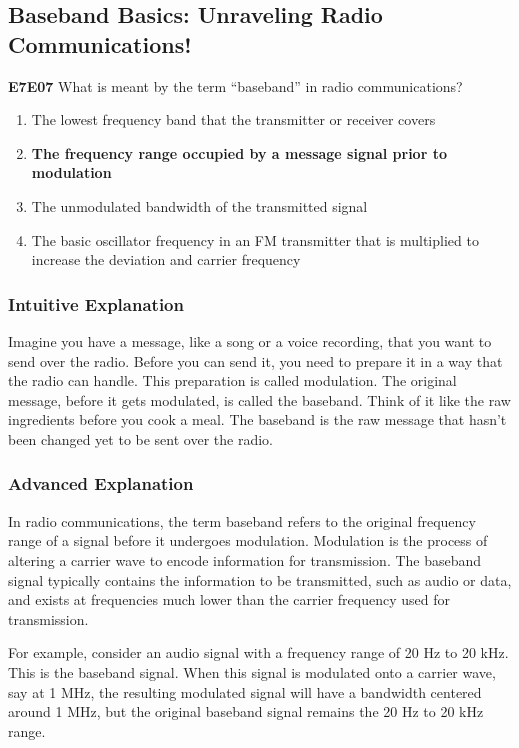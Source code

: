 \subsection{Baseband Basics: Unraveling Radio Communications!}

\begin{tcolorbox}[colback=gray!10!white,colframe=black!75!black,title=Multiple Choice Question]
\textbf{E7E07} What is meant by the term “baseband” in radio communications?

\begin{enumerate}[label=\Alph*.]
    \item The lowest frequency band that the transmitter or receiver covers
    \item \textbf{The frequency range occupied by a message signal prior to modulation}
    \item The unmodulated bandwidth of the transmitted signal
    \item The basic oscillator frequency in an FM transmitter that is multiplied to increase the deviation and carrier frequency
\end{enumerate}
\end{tcolorbox}

\subsubsection*{Intuitive Explanation}
Imagine you have a message, like a song or a voice recording, that you want to send over the radio. Before you can send it, you need to prepare it in a way that the radio can handle. This preparation is called modulation. The original message, before it gets modulated, is called the baseband. Think of it like the raw ingredients before you cook a meal. The baseband is the raw message that hasn't been changed yet to be sent over the radio.

\subsubsection*{Advanced Explanation}
In radio communications, the term baseband refers to the original frequency range of a signal before it undergoes modulation. Modulation is the process of altering a carrier wave to encode information for transmission. The baseband signal typically contains the information to be transmitted, such as audio or data, and exists at frequencies much lower than the carrier frequency used for transmission.

For example, consider an audio signal with a frequency range of 20 Hz to 20 kHz. This is the baseband signal. When this signal is modulated onto a carrier wave, say at 1 MHz, the resulting modulated signal will have a bandwidth centered around 1 MHz, but the original baseband signal remains the 20 Hz to 20 kHz range.

